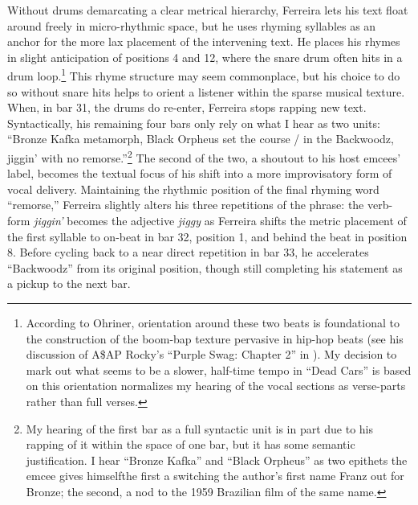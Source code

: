 Without drums demarcating a clear metrical hierarchy, Ferreira lets his text float around freely in 
micro-rhythmic space, but he uses rhyming syllables as an anchor for the more lax placement of the 
intervening text. He places his rhymes in slight anticipation of positions 4 and 12, where the snare
drum often hits in a drum loop.\footnote{
    According to Ohriner, orientation around these two beats is foundational to the 
    construction of the boom-bap texture pervasive in hip-hop beats (see his discussion
    of A\$AP Rocky's ``Purple Swag:  Chapter 2'' in 
    \autocite[18]{mitchellohrinerFlowRhythmicVoice2019}). My decision to mark out what 
    seems to be a slower, half-time tempo in ``Dead Cars'' is based on this orientation
    normalizes my hearing of the vocal sections as verse-parts rather than full verses.}
This rhyme structure may seem commonplace, but his choice to do so without snare hits helps to orient
a listener within the sparse musical texture. When, in bar 31, the drums do re-enter, Ferreira stops
rapping new text. Syntactically, his remaining four bars only rely on what I hear as two units: ``Bronze
Kafka metamorph, Black Orpheus set the course / in the Backwoodz, jiggin' with no remorse.''\footnote{
    My hearing of the first bar as a full syntactic unit is in part due to his rapping 
    of it within the space of one bar, but it has some semantic justification. I hear
    ``Bronze Kafka'' and ``Black Orpheus'' as two epithets the emcee gives 
    himself\textemdash the first a switching the author's first name Franz out for Bronze; the second,
    a nod to the 1959 Brazilian film of the same name.}
The second of the two, a shoutout to his host emcees' label, becomes the textual focus of his shift into
a more improvisatory form of vocal delivery. Maintaining the rhythmic position of the final rhyming word
``remorse,'' Ferreira slightly alters his three repetitions of the phrase: the verb-form \textit{jiggin'}
becomes the adjective \textit{jiggy} as Ferreira shifts the metric placement of the first syllable to 
on-beat in bar 32, position 1, and behind the beat in position 8. Before cycling back to a near direct 
repetition in bar 33, he accelerates ``Backwoodz'' from its original position, though still completing his
statement as a pickup to the next bar.

